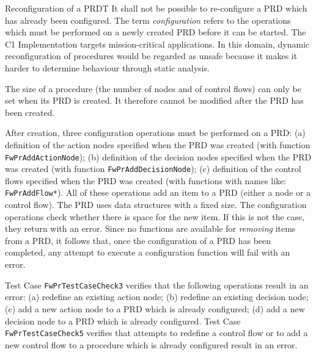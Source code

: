 \documentclass[a4paper,10pt]{article}
\newenvironment{fw_req_note}[7]
{\addtocounter{subsubsection}{1}
	\hspace{0.2cm}\textbf{FW-\arabic{section}.\arabic{subsection}.\arabic{subsubsection}/#2
	\hspace{0.8cm} #1}
	\vspace{-10pt}
\begin{longtable}{p{2.7cm}P{8.5cm}}
\hline
\textsc{Requirement} & #3 \\
\textsc{Note} & #4 \\
\textsc{Justification} & #5 \\
\textsc{Implementation} & #6  \\ 
\textsc{Verification} & #7  \\
\hline
}
{\end{longtable}}
\begin{document}
\begin{fw_req_note}{Reconfiguration of a PRD}{T}
{It shall not be possible to re-configure a PRD which has already been configured.}
{The term \textit{configuration} refers to the operations which must be performed on a newly created PRD before it can be started.}
{ The C1 Implementation targets mission-critical applications. 
In this domain, dynamic reconfiguration of procedures would be regarded as unsafe because it makes 
it harder to determine behaviour through static analysis.}
{ The size of a procedure (the number of nodes and of control flows) 
can only be set when its PRD is created. It therefore cannot be modified after the PRD has been created.

After creation, three configuration operations must be performed on a PRD: 
(a) definition of the action nodes specified when the PRD was created (with function \texttt{FwPrAddActionNode}); 
(b) definition of the decision nodes specified when the PRD was created (with function \texttt{FwPrAddDecisionNode}); 
(c) definition of the control flows specified when the PRD was created (with functions with names like: \texttt{FwPrAddFlow*}). 
All of these operations add an item to a PRD (either a node or a control flow). The PRD uses data structures with a fixed size. The configuration operations check whether there is space for the new item. If this is not the case, they return with an error. Since no functions are available for \emph{removing} items from a PRD, it follows that, once the configuration of a PRD has been completed, any attempt to execute a configuration function will fail with an error.
} 
{ Test Case \texttt{FwPrTestCaseCheck3} verifies that the following operations 
result in an error: (a) redefine an existing action node; (b) redefine an existing decision node; 
(c) add a new action node to a PRD which is already configured; (d) add a new decision node to a 
PRD which is already configured. 
Test Case \texttt{FwPrTestCaseCheck5} verifies that attempts to redefine a control flow or to add a 
new control flow to a procedure which is already configured result in an error.}
\end{fw_req_note}
\end{document}
